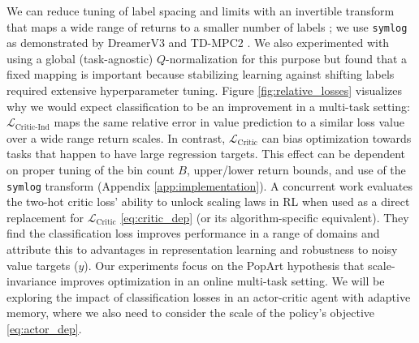 \documentclass{article}
\begin{document}
We can reduce tuning of label spacing and limits with an invertible transform that maps a wide range of returns to a smaller number of labels \cite{kapturowski2018recurrent}; we use \texttt{symlog} as demonstrated by DreamerV3 \cite{hafner2023mastering} and TD-MPC2 \cite{hansen2023td}. We also experimented with using a global (task-agnostic) $Q$-normalization for this purpose but found that a fixed mapping is important because stabilizing learning against shifting labels required extensive hyperparameter tuning. Figure \ref{fig:relative_losses} visualizes why we would expect classification to be an improvement in a multi-task setting: $\mathcal{L}_{\text{Critic-Ind}}$ maps the same relative error in value prediction to a similar loss value over a wide range return scales. In contrast, $\mathcal{L}_{\text{Critic}}$ can bias optimization towards tasks that happen to have large regression targets. This effect can be dependent on proper tuning of the bin count $B$, upper/lower return bounds, and use of the \texttt{symlog} transform (Appendix \ref{app:implementation}).
A concurrent work \cite{farebrother2024stop} evaluates the two-hot critic loss' ability to unlock scaling laws in RL when used as a direct replacement for $\mathcal{L}_{\text{Critic}}$ \eqref{eq:critic_dep} (or its algorithm-specific equivalent). They find the classification loss improves performance in a range of domains and attribute this to advantages in representation learning and robustness to noisy value targets ($y$). Our experiments focus on the PopArt hypothesis that scale-invariance improves optimization in an online multi-task setting. We will be exploring the impact of classification losses in an actor-critic agent with adaptive memory, where we also need to consider the scale of the policy's objective \eqref{eq:actor_dep}.
\end{document}
